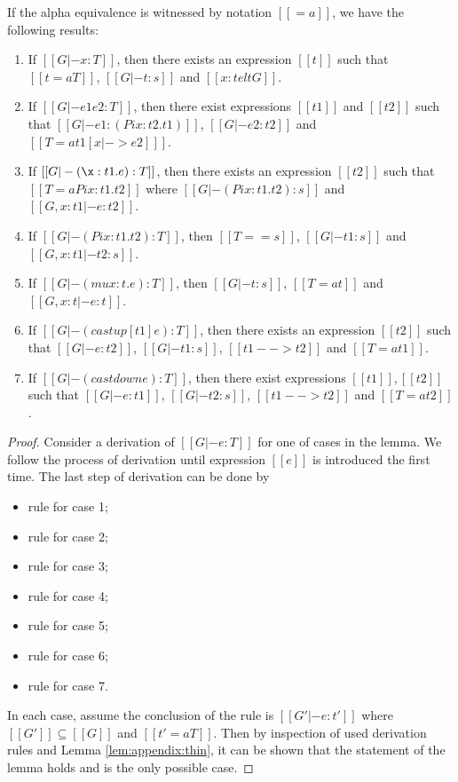 \begin{lemma}[Generation]\label{lem:appendix:gen}
If the alpha equivalence is witnessed by notation $[[=a]]$, we have the following results:
\begin{enumerate}[(1)]
	\item If $[[G |- x:T]]$, then there exists an expression $[[t]]$ such that $[[t
=a T]]$, $[[G |- t:s]]$ and $[[x:t elt G]]$.
	\item If $[[G |- e1 e2:T]]$, then there exist expressions $[[t1]]$ and
$[[t2]]$ such that $[[G |- e1 : (Pi x:t2.t1)]]$, $[[G |- e2:t2]]$ and $[[T =a
t1[x |-> e2] ]]$.
	\item If $[[G |- (\x:t1.e):T]]$, then there exists an expression $[[t2]]$ such
that $[[T =a Pi x:t1.t2]]$ where $[[G |- (Pi x:t1.t2):s]]$ and $[[G,x:t1 |-
e:t2]]$.
    \item If $[[G |- (Pi x:t1.t2):T]]$, then $[[T == s]]$, $[[G |- t1:s]]$ and
$[[G, x:t1 |- t2:s]]$.
	\item If $[[G |- (mu x:t.e):T]]$, then $[[G |- t:s]]$, $[[T =a t]]$ and $[[G,
x:t|-e:t]]$.
	\item If $[[G |- (castup [t1] e):T]]$, then there exists an expression $[[t2]]$
such that $[[G |- e:t2]]$, $[[G |- t1:s]]$, $[[t1 --> t2]]$ and $[[T =a t1]]$.
	\item If $[[G |- (castdown e):T]]$, then there exist expressions
$[[t1]],[[t2]]$ such that $[[G |- e:t1]]$, $[[G |- t2:s]]$, $[[t1 --> t2]]$ and
$[[T =a t2]]$.
\end{enumerate}
\end{lemma}

\begin{proof}
    Consider a derivation of $[[G |- e:T]]$ for one of cases in the lemma. We
follow the process of derivation until expression $[[e]]$ is introduced the
first time. The last step of derivation can be done by
    \begin{itemize}
        \item rule  for case 1;
        \item rule  for case 2;
        \item rule  for case 3;
        \item rule  for case 4;
        \item rule  for case 5;
        \item rule  for case 6;
        \item rule  for case 7.
    \end{itemize}
    In each case, assume the conclusion of the rule is $[[G' |- e : t']]$ where
$[[G']] \subseteq [[G]]$ and $[[t' =a T]]$. Then by inspection of used
derivation rules and Lemma \ref{lem:appendix:thin}, it can be shown that the
statement of the lemma holds and is the only possible case.
\end{proof}

